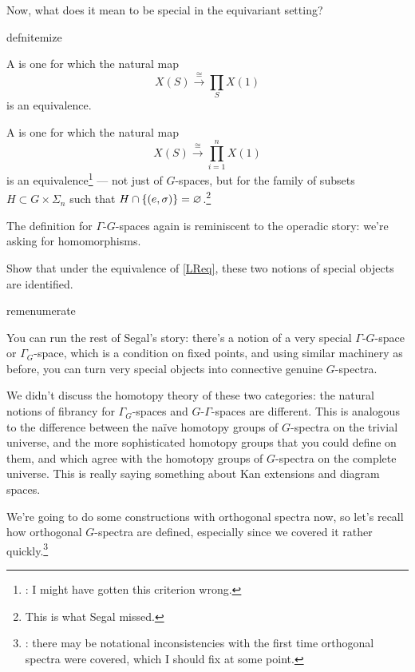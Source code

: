 Now, what does it mean to be special in the equivariant setting?
\begin{comp}{defn}{itemize}
	\item A  is one for which the natural map
	\[X(S)\stackrel\cong\longrightarrow \prod_S X(1)\]
	is an equivalence.
	\item A  is one for which the natural map
	\[X(S)\stackrel\cong\longrightarrow \prod_{i=1}^n X(1)\] 
	is an equivalence\footnote{\TODO: I might have gotten this criterion wrong.} --- not just of $G$-spaces, but
	for the family of subsets $H\subset G\times\Sigma_n$ such that $H\cap\{(e,\sigma)\} =
	\varnothing$.\footnote{This is what Segal missed.}
\end{comp}
The definition for $\Gamma$-$G$-spaces again is reminiscent to the operadic story: we're asking for homomorphisms.
\begin{ex}
Show that under the equivalence of \cref{LReq}, these two notions of special objects are identified.
\end{ex}
\begin{comp}{rem}{enumerate}
	\item You can run the rest of Segal's story: there's a notion of a very special $\Gamma$-$G$-space or
	$\Gamma_G$-space, which is a condition on fixed points, and using similar machinery as before, you can turn
	very special objects into connective genuine $G$-spectra.
	\item We didn't discuss the homotopy theory of these two categories: the natural notions of fibrancy for
	$\Gamma_G$-spaces and $G$-$\Gamma$-spaces are different. This is analogous to the difference between the naïve
	homotopy groups of $G$-spectra on the trivial universe, and the more sophisticated homotopy groups that you
	could define on them, and which agree with the homotopy groups of $G$-spectra on the complete universe. This
	is really saying something about Kan extensions and diagram spaces. \qedhere
\end{comp}
We're going to do some constructions with orthogonal spectra now, so let's recall how orthogonal $G$-spectra are
defined, especially since we covered it rather quickly.\footnote{\TODO: there may be notational inconsistencies
with the first time orthogonal spectra were covered, which I should fix at some point.}


